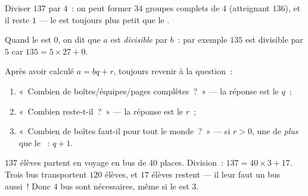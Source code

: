 \begin{omfigure}

{\small Diviser $137$ par $4$~: on peut former $34$ groupes complets
de $4$ (atteignant $136$), et il reste $1$ --- le  est toujours
plus petit que le .}
\end{omfigure}

\begin{definition}[Divisible]\label{def:g6:wholes:divisible}
Quand le  est $0$, on dit que $a$ est
\emph{divisible} par $b$~: par exemple $135$ est
divisible par $5$ car $135 = 5 \times 27 + 0$.
\end{definition}

\begin{method}\label{met:g6:wholes:problems}
Après avoir calculé $a = bq + r$, toujours revenir à la question~:
\begin{enumerate}
  \item «~Combien de boîtes/équipes/pages complètes~?~» --- la
        réponse est le  $q$~;
  \item «~Combien reste-t-il~?~» --- la réponse est le  $r$~;
  \item «~Combien de boîtes faut-il pour tout le monde~?~» --- si
        $r > 0$, une de \emph{plus} que le ~: $q + 1$.
\end{enumerate}
\end{method}

\begin{example}\label{ex:g6:wholes:bus}
$137$ élèves partent en voyage en bus de $40$ places. Division~:
$137 = 40 \times 3 + 17$. Trois bus transportent $120$ élèves, et
$17$ élèves restent --- il leur faut un bus aussi~! Donc $4$ bus sont
nécessaires, même si le  est $3$.
\end{example}

